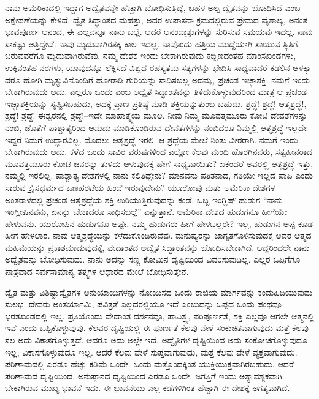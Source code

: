 ನಾನು ಅಮೆರಿಕಾದಲ್ಲಿ ಇದ್ದಾಗ ಅದ್ವೈತವನ್ನೇ ಹೆಚ್ಚಾಗಿ ಬೋಧಿಸುತ್ತಿದ್ದೆ, ಬಹಳ ಅಲ್ಪ ದ್ವೈತವನ್ನು ಬೋಧಿಸಿದೆ ಎಂಬ ಅಕ್ಷೇಪಣೆಯನ್ನು ಕೇಳಿದೆ. ದ್ವೈತ ಸಿದ್ಧಾಂತದ ಮಹತ್ತು, ಅದರ ಉಪಾಸನಾ ಕ್ರಮದಲ್ಲಿರುವ ಪ್ರೇಮದ ವೈಶಾಲ್ಯ, ಅನಂತ ಭಾವಪೂರ್ಣ ಆನಂದ, ಈ ಎಲ್ಲವನ್ನೂ ನಾನು ಬಲ್ಲೆ. ಆದರೆ ಆನಂದಾಶ್ರುಗಳನ್ನು ಸುರಿಸುವ ಸಮಯವು ಇದಲ್ಲ. ನಾವು ಸಾಕಷ್ಟು ಅತ್ತಿದ್ದೇವೆ. ನಾವು ಮೃದುವಾಗಿರತಕ್ಕ ಕಾಲ ಇದಲ್ಲ. ನಾವೊಂದು ಹತ್ತಿಯ ಮುದ್ದೆಯಾಗಿ ಸಾಯುವ ಸ್ಥಿತಿಗೆ ಬರುವವರೆಗೂ ಮೃದುವಾಗಿರುವೆವು. ನಮ್ಮ ದೇಶಕ್ಕೆ ಇಂದು ಬೇಕಾಗಿರುವುದು ಕಬ್ಬಿಣದಂತಹ ಮಾಂಸಖಂಡಗಳು, ಉಕ್ಕಿನಂತಹ ನರಗಳು, ಯಾವುದನ್ನೂ ಲೆಕ್ಕಿಸದೆ ವಿಶ್ವದ ರಹಸ್ಯತಮ ಸತ್ಯಗಳನ್ನು ಭೇದಿಸಿ ಸಾಧ್ಯವಾದರೆ ಕಡಲಿನ ಆಳಕ್ಕಾ ದರೂ ಹೋಗಿ ಮೃತ್ಯುವಿನೊಂದಿಗೆ ಹೋರಾಡಿ ಗುರಿಯನ್ನು ಸಾಧಿಸಬಲ್ಲ ಅದಮ್ಯ, ಪ್ರಚಂಡ ಇಚ್ಛಾಶಕ್ತಿ. ನಮಗೆ ಇಂದು ಬೇಕಾಗಿರುವುದು ಅದು. ಎಲ್ಲರೂ ಒಂದು ಎಂಬ ಅದ್ವೈತ ಸಿದ್ಧಾಂತವನ್ನು ತಿಳಿದುಕೊಳ್ಳುವುದರಿಂದ ಮಾತ್ರ ಆ ಪ್ರಚಂಡ ಇಚ್ಛಾಶಕ್ತಿಯನ್ನು ಸೃಷ್ಟಿಸಬಹುದು, ಅದಕ್ಕೆ ಪ್ರಾಣ ಪ್ರತಿಷ್ಠೆ ಮಾಡಿ ಶಕ್ತಿಯನ್ನುತುಂಬ ಬಹುದು. ಶ್ರದ್ಧೆ! ಶ್ರದ್ಧೆ! ಆತ್ಮಶ್ರದ್ಧೆ!, ಶ್ರದ್ಧೆ! ಶ್ರದ್ಧೆ! ಈಶ್ವರನಲ್ಲಿ ಶ್ರದ್ಧೆ!–ಇದೇ ಮಾಹಾತ್ಮ್ಯೆಯ ಮೂಲ. ನೀವು ನಿಮ್ಮ ಮೂವತ್ತಮೂರು ಕೋಟಿ ದೇವತೆಗಳನ್ನು ನಂಬಿ, ಜೊತೆಗೆ ಪಾಶ್ಚಾತ್ಯರಿಂದ ಆಮದು ಮಾಡಿಕೊಂಡಿರುವ ದೇವತೆಗಳನ್ನು ನಂಬಿದರೂ ನಿಮ್ಮಲ್ಲಿ ಆತ್ಮಶ್ರದ್ಧೆ ಇಲ್ಲದೇ ಇದ್ದರೆ ನಿಮಗೆ ಉದ್ಧಾರವಿಲ್ಲ. ಮೊದಲು ಆತ್ಮಶ್ರದ್ಧೆ ಇರಲಿ. ಆ ಶ್ರದ್ಧೆಯ ಮೇಲೆ ನಿಂತು ವೀರರಾಗಿ. ನಮಗೆ ಇಂದು ಬೇಕಾಗಿರುವುದು ಅದು. ಕಳೆದ ಒಂದು ಸಾವಿರ ವರುಷಗಳಿಂದ ಎಲ್ಲೋ ಕೆಲವು ಮಂದಿ ಹೊರಗಿನವರು, ಸತ್ವಹೀನರಾದ ಮೂವತ್ತಮೂರು ಕೋಟಿ ಜನರನ್ನು ತುಳಿದು ಆಳುವುದಕ್ಕೆ ಹೇಗೆ ಸಾಧ್ಯವಾಯಿತು? ಏಕೆಂದರೆ ಅವರಲ್ಲಿ ಆತ್ಮಶ್ರದ್ಧೆ ಇತ್ತು, ನಮ್ಮಲ್ಲಿ ಇರಲಿಲ್ಲ. ಪಾಶ್ಚಾತ್ಯ ದೇಶಗಳಲ್ಲಿ ನಾನು ಕಲಿತಿದ್ದೇನು? ಮಾನವನು ಪತಿತನಾದ, ಗತಿಯೇ ಇಲ್ಲದ ಪಾಪಿ ಎಂದು ಸಾರುವ ಕ್ರೈಸ್ತಧರ್ಮದ ಒಣಹರಟೆಯ ಹಿಂದೆ ಇರುವುದೇನು? ಯೂರೋಪು ಮತ್ತು ಅಮೆರಿಕಾ ದೇಶಗಳ ಅಂತರಾಳದಲ್ಲಿ ಪ್ರಚಂಡ ಆತ್ಮಶ್ರದ್ಧೆಯ ಶಕ್ತಿ ಉರಿಯುತ್ತಿರುವುದನ್ನು ಕಂಡೆ. ಒಬ್ಬ ಇಂಗ್ಲಿಷ್​ ಹುಡುಗ “ನಾನು ಇಂಗ್ಲೀಷಿನವನು, ಏನನ್ನು ಬೇಕಾದರೂ ಸಾಧಿಸಬಲ್ಲೆ” ಎನ್ನುತ್ತಾನೆ. ಅಮೆರಿಕಾ ದೇಶದ ಹುಡುಗನೂ ಹೀಗೆಯೇ ಹೇಳುವನು. ಯುರೋಪಿನ ಹುಡುಗನೂ ಅಷ್ಟೇ. ನಮ್ಮ ಹುಡುಗರು ಹೀಗೆ ಹೇಳಬಲ್ಲರೇ? ಇಲ್ಲ, ಹುಡುಗನ ಅಪ್ಪ ಕೂಡ ಹೀಗೆ ಹೇಳಲಾರ. ನಾವು ಆತ್ಮಶ್ರದ್ಧೆಯನ್ನು ಕಳೆದುಕೊಂಡಿರುವೆವು. ಮನುಷ್ಯರನ್ನು ಜಾಗೃತಗೊಳಿಸುವುದಕ್ಕೆ ಅವರ ಆತ್ಮದ ಮಹಿಮೆಯನ್ನು ಪ್ರಕಾಶಮಾಡುವುದಕ್ಕೆ, ವೇದಾಂತದ ಅದ್ವೈತ ಸಿದ್ಧಾಂತವನ್ನು ಬೋಧಿಸಬೇಕಾಗಿದೆ. ಆದ್ದರಿಂದಲೇ ನಾನು ಅದ್ವೈತವನ್ನು ಬೋಧಿಸುವುದು. ನಾನು ಅದನ್ನು ಸಣ್ಣ ಕೋಮಿನ ದೃಷ್ಟಿಯಿಂದ ವಿವರಿಸುವುದಿಲ್ಲ. ಎಲ್ಲರ ಒಪ್ಪಿಗೆಗೂ ಪಾತ್ರವಾದ ಸರ್ವಸಾಮಾನ್ಯ ತತ್ತ್ವಗಳ ಆಧಾರದ ಮೇಲೆ ಬೋಧಿಸುತ್ತೇನೆ. 

ದ್ವೈತ ಮತ್ತು ವಿಶಿಷ್ಟಾದ್ವೈತಗಳ ಅನುಯಾಯಿಗಳನ್ನು ನೋಯಿಸದ ಒಂದು ರಾಜಿಯ ಮಾರ್ಗವನ್ನು ಕಂಡುಹಿಡಿಯುವುದು ಸುಲಭ. ದೇವರು ಅಂತರ್ಯಾಮಿ, ಪವಿತ್ರತೆ ಎಲ್ಲದರಲ್ಲಿಯೂ ಇದೆ ಎಂಬುದನ್ನು ಒಪ್ಪದ ಒಂದು ಪಂಥವೂ ಭರತಖಂಡದಲ್ಲಿ ಇಲ್ಲ. ಪ್ರತಿಯೊಂದು ವೇದಾಂತ ದರ್ಶನವೂ, ಪಾವಿತ್ರ್ಯ, ಪರಿಪೂರ್ಣತೆ, ಶಕ್ತಿ ಎಲ್ಲವೂ ಆಗಲೇ ಆತ್ಮನಲ್ಲಿ ಇವೆ ಎಂದು ಒಪ್ಪಿಕೊಳ್ಳುವುವು. ಕೆಲವರ ದೃಷ್ಟಿಯಲ್ಲಿ ಈ ಪೂರ್ಣತೆ ಕೆಲವು ವೇಳೆ ಸಂಕುಚಿತವಾಗುವುದು ಮತ್ತೆ ಕೆಲವು ಸಲ ಅದು ವಿಕಾಸಗೊಳ್ಳುತ್ತದೆ. ಆದರೂ ಅದು ಅಲ್ಲೇ ಇದೆ. ಅದ್ವೈತಿಗಳ ದೃಷ್ಟಿಯಿಂದ ಅದು ಸಂಕೋಚಗೊಳ್ಳುವುದೂ ಇಲ್ಲ, ವಿಕಾಸಗೊಳ್ಳುವುದೂ ಇಲ್ಲ. ಆದರೆ ಕೆಲವು ವೇಳೆ ಸುಪ್ತವಾಗುವುದು, ಮತ್ತೆ ಕೆಲವು ವೇಳೆ ವ್ಯಕ್ತವಾಗುವುದು. ಪರಿಣಾಮದಲ್ಲಿ ಎರಡೂ ಹೆಚ್ಚು ಕಡಿಮೆ ಒಂದೇ. ಒಂದು ಮತ್ತೊಂದಕ್ಕಿಂತ ಯುಕ್ತಿಯುಕ್ತವಾಗಿರಬಹುದು. ಆದರೆ ಪರಿಣಾಮದ ದೃಷ್ಟಿಯಿಂದ, ಅನುಷ್ಠಾನದ ದೃಷ್ಟಿಯಿಂದ ಎರಡೂ ಒಂದೇ. ಜಗತ್ತಿಗೆ ಇಂದು ಅತ್ಯಾವಶ್ಯಕವಾಗಿ ಬೇಕಾಗಿರುವ ಮುಖ್ಯ ಭಾವನೆ ಇದು. ಈ ಭಾವನೆಯು ಎಲ್ಲ ಕಡೆಗಳಿಗಿಂತ ಹೆಚ್ಚಾಗಿ ಈ ದೇಶಕ್ಕೆ ಅಗತ್ಯವಾಗಿದೆ. 

